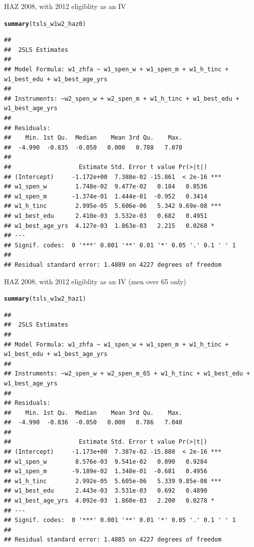 \documentclass[a4paper]{report}\usepackage{graphicx, color}
\makeatletter
\newcommand{\hlfunctioncall}[1]{\textcolor[rgb]{0.501960784313725,0,0.329411764705882}{\textbf{#1}}}%
\newenvironment{kframe}{%
 \def\at@end@of@kframe{}%
 \ifinner\ifhmode%
  \def\at@end@of@kframe{\end{minipage}}%
  \begin{minipage}{\columnwidth}%
 \fi\fi%
 \def\FrameCommand##1{\hskip\@totalleftmargin \hskip-\fboxsep
 \colorbox{shadecolor}{##1}\hskip-\fboxsep
     \hskip-\linewidth \hskip-\@totalleftmargin \hskip\columnwidth}%
 \MakeFramed {\advance\hsize-\width
   \@totalleftmargin\z@ \linewidth\hsize
   \@setminipage}}%
 {\par\unskip\endMakeFramed%
 \at@end@of@kframe}
\newenvironment{knitrout}{}{} %
\makeatother
\begin{document}
\begin{refsection}
HAZ 2008, with 2012 eligiblity as an IV
\begin{knitrout}
\color{fgcolor}\begin{kframe}
\begin{alltt}
\hlfunctioncall{summary}(tsls_w1w2_haz0)
\end{alltt}
\begin{verbatim}
## 
##  2SLS Estimates
## 
## Model Formula: w1_zhfa ~ w1_spen_w + w1_spen_m + w1_h_tinc + w1_best_edu + w1_best_age_yrs
## 
## Instruments: ~w2_spen_w + w2_spen_m + w1_h_tinc + w1_best_edu + w1_best_age_yrs
## 
## Residuals:
##    Min. 1st Qu.  Median    Mean 3rd Qu.    Max. 
##  -4.990  -0.835  -0.050   0.000   0.788   7.070 
## 
##                   Estimate Std. Error t value Pr(>|t|)    
## (Intercept)     -1.172e+00  7.388e-02 -15.861  < 2e-16 ***
## w1_spen_w        1.748e-02  9.477e-02   0.184   0.8536    
## w1_spen_m       -1.374e-01  1.444e-01  -0.952   0.3414    
## w1_h_tinc        2.995e-05  5.606e-06   5.342 9.69e-08 ***
## w1_best_edu      2.410e-03  3.532e-03   0.682   0.4951    
## w1_best_age_yrs  4.127e-03  1.863e-03   2.215   0.0268 *  
## ---
## Signif. codes:  0 '***' 0.001 '**' 0.01 '*' 0.05 '.' 0.1 ' ' 1
## 
## Residual standard error: 1.4889 on 4227 degrees of freedom
\end{verbatim}
\end{kframe}
\end{knitrout}


HAZ 2008, with 2012 eligiblity as an IV (men over 65 only)
\begin{knitrout}
\color{fgcolor}\begin{kframe}
\begin{alltt}
\hlfunctioncall{summary}(tsls_w1w2_haz1)
\end{alltt}
\begin{verbatim}
## 
##  2SLS Estimates
## 
## Model Formula: w1_zhfa ~ w1_spen_w + w1_spen_m + w1_h_tinc + w1_best_edu + w1_best_age_yrs
## 
## Instruments: ~w2_spen_w + w2_spen_m_65 + w1_h_tinc + w1_best_edu + w1_best_age_yrs
## 
## Residuals:
##    Min. 1st Qu.  Median    Mean 3rd Qu.    Max. 
##  -4.990  -0.836  -0.050   0.000   0.786   7.040 
## 
##                   Estimate Std. Error t value Pr(>|t|)    
## (Intercept)     -1.173e+00  7.387e-02 -15.880  < 2e-16 ***
## w1_spen_w        8.576e-03  9.541e-02   0.090   0.9284    
## w1_spen_m       -9.189e-02  1.348e-01  -0.681   0.4956    
## w1_h_tinc        2.992e-05  5.605e-06   5.339 9.85e-08 ***
## w1_best_edu      2.443e-03  3.531e-03   0.692   0.4890    
## w1_best_age_yrs  4.092e-03  1.860e-03   2.200   0.0278 *  
## ---
## Signif. codes:  0 '***' 0.001 '**' 0.01 '*' 0.05 '.' 0.1 ' ' 1
## 
## Residual standard error: 1.4885 on 4227 degrees of freedom
\end{verbatim}
\end{kframe}
\end{knitrout}


\printbibliography

\end{refsection}
\end{document}
